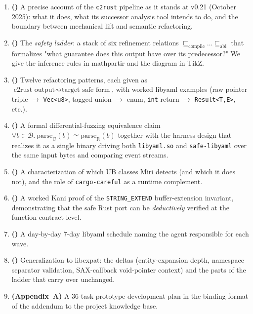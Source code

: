 \documentclass[12pt]{article}
\theoremstyle{definition}
\theoremstyle{remark}
\begin{document}
\begin{enumerate}
\item \textbf{()} A precise account of the
\texttt{c2rust} pipeline as it stands at v0.21 (October 2025): what it
does, what its successor analysis tool intends to do, and the boundary
between mechanical lift and semantic refactoring.

\item \textbf{()} The \emph{safety ladder}: a stack of
six refinement relations
$\sqsubseteq_{\mathrm{compile}} \dots \sqsubseteq_{\mathrm{abi}}$ that
formalizes "what guarantee does this output have over its predecessor?"
We give the inference rules in mathpartir and the diagram in TikZ.

\item \textbf{()} Twelve refactoring patterns,
each given as
$\text{c2rust output} \rightsquigarrow \text{target safe form}$, with
worked libyaml examples (raw pointer triple $\to$ \texttt{Vec<u8>},
tagged union $\to$ enum, \texttt{int} return $\to$
\texttt{Result<T,E>}, etc.).

\item \textbf{()} A formal differential-fuzzing
equivalence claim
$\forall b{\in}\mathcal{B}.~\mathrm{parse}_{\mathrm{C}}(b)
 \simeq \mathrm{parse}_{\mathrm{R}}(b)$
together with the harness design that realizes it as a single binary
driving both \texttt{libyaml.so} and \texttt{safe-libyaml} over the same
input bytes and comparing event streams.

\item \textbf{()} A characterization of which UB classes
Miri detects (and which it does not), and the role of \texttt{cargo-careful}
as a runtime complement.

\item \textbf{()} A worked Kani proof of the
\texttt{STRING\_EXTEND} buffer-extension invariant, demonstrating that
the safe Rust port can be \emph{deductively} verified at the
function-contract level.

\item \textbf{()} A day-by-day 7-day libyaml schedule
naming the agent responsible for each wave.

\item \textbf{()} Generalization to libexpat: the
deltas (entity-expansion depth, namespace separator validation,
SAX-callback void-pointer context) and the parts of the ladder that
carry over unchanged.

\item \textbf{(Appendix~A)} A 36-task prototype development plan in
the binding format of the addendum to the project knowledge base.
\end{enumerate}
\end{document}
